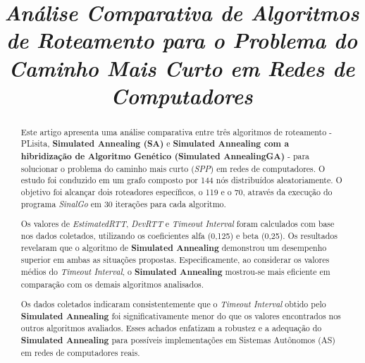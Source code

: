 \documentclass[conference]{IEEEtran}
\begin{document}
\providecommand{\keywords}[1]
{
  \small	
  \textbf{\textit{Palavras-chave---}} #1
}

\title{\textit{Análise Comparativa de Algoritmos de Roteamento para o Problema do Caminho Mais Curto em Redes de Computadores}}

\author{
}

\maketitle

\begin{abstract}
Este artigo apresenta uma análise comparativa entre três algoritmos de roteamento - PLisita, \textbf{Simulated Annealing (SA)} e \textbf{Simulated Annealing com a hibridização de Algoritmo Genético (Simulated AnnealingGA)} - para solucionar o problema do caminho mais curto (\textit{SPP}) em redes de computadores. O estudo foi conduzido em um grafo composto por 144 nós distribuídos aleatoriamente. O objetivo foi alcançar dois roteadores específicos, o 119 e o 70, através da execução do programa \textit{SinalGo} em 30 iterações para cada algoritmo.

Os valores de \textit{EstimatedRTT}, \textit{DevRTT} e \textit{Timeout Interval} foram calculados com base nos dados coletados, utilizando os coeficientes alfa (0,125) e beta (0,25). Os resultados revelaram que o algoritmo de \textbf{Simulated Annealing} demonstrou um desempenho superior em ambas as situações propostas. Especificamente, ao considerar os valores médios do \textit{Timeout Interval}, o \textbf{Simulated Annealing} mostrou-se mais eficiente em comparação com os demais algoritmos analisados.

Os dados coletados indicaram consistentemente que o \textit{Timeout Interval} obtido pelo \textbf{Simulated Annealing} foi significativamente menor do que os valores encontrados nos outros algoritmos avaliados. Esses achados enfatizam a robustez e a adequação do \textbf{Simulated Annealing} para possíveis implementações em Sistemas Autônomos (AS) em redes de computadores reais.
\end{abstract}
\end{document}
